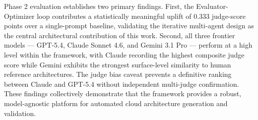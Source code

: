 Phase 2 evaluation establishes two primary findings. First, the Evaluator-Optimizer loop contributes a statistically meaningful uplift of 0.333 judge-score points over a single-prompt baseline, validating the iterative multi-agent design as the central architectural contribution of this work. Second, all three frontier models — GPT-5.4, Claude Sonnet 4.6, and Gemini 3.1 Pro — perform at a high level within the framework, with Claude recording the highest composite judge score while Gemini exhibits the strongest surface-level similarity to human reference architectures. The judge bias caveat prevents a definitive ranking between Claude and GPT-5.4 without independent multi-judge confirmation. These findings collectively demonstrate that the framework provides a robust, model-agnostic platform for automated cloud architecture generation and validation.
